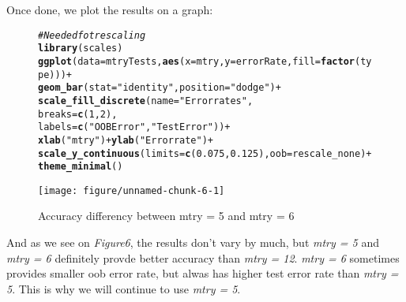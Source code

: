 \documentclass{article}\usepackage[]{graphicx}\usepackage[]{color}
\makeatletter
\newcommand{\hlnum}[1]{\textcolor[rgb]{0.686,0.059,0.569}{#1}}%
\newcommand{\hlstr}[1]{\textcolor[rgb]{0.192,0.494,0.8}{#1}}%
\newcommand{\hlcom}[1]{\textcolor[rgb]{0.678,0.584,0.686}{\textit{#1}}}%
\newcommand{\hlopt}[1]{\textcolor[rgb]{0,0,0}{#1}}%
\newcommand{\hlstd}[1]{\textcolor[rgb]{0.345,0.345,0.345}{#1}}%
\newcommand{\hlkwc}[1]{\textcolor[rgb]{0.333,0.667,0.333}{#1}}%
\newcommand{\hlkwd}[1]{\textcolor[rgb]{0.737,0.353,0.396}{\textbf{#1}}}%
\newenvironment{kframe}{%
 \def\at@end@of@kframe{}%
 \ifinner\ifhmode%
  \def\at@end@of@kframe{\end{minipage}}%
  \begin{minipage}{\columnwidth}%
 \fi\fi%
 \def\FrameCommand##1{\hskip\@totalleftmargin \hskip-\fboxsep
 \colorbox{shadecolor}{##1}\hskip-\fboxsep
     \hskip-\linewidth \hskip-\@totalleftmargin \hskip\columnwidth}%
 \MakeFramed {\advance\hsize-\width
   \@totalleftmargin\z@ \linewidth\hsize
   \@setminipage}}%
 {\par\unskip\endMakeFramed%
 \at@end@of@kframe}
\newenvironment{knitrout}{}{} %
\makeatother
\begin{document}
\begin{itemize}
Once done, we plot the results on a graph:
\begin {figure}[H]
\begin {center}
\begin{knitrout}
\color{fgcolor}\begin{kframe}
\begin{alltt}
\hlcom{#Needed fot rescaling}
\hlkwd{library}\hlstd{(scales)}
\hlkwd{ggplot}\hlstd{(}\hlkwc{data}\hlstd{=mtryTests,} \hlkwd{aes}\hlstd{(}\hlkwc{x}\hlstd{=mtry,} \hlkwc{y}\hlstd{=errorRate,} \hlkwc{fill}\hlstd{=}\hlkwd{factor}\hlstd{(type)))} \hlopt{+}
  \hlkwd{geom_bar}\hlstd{(}\hlkwc{stat}\hlstd{=}\hlstr{"identity"}\hlstd{,} \hlkwc{position}\hlstd{=}\hlstr{"dodge"}\hlstd{)} \hlopt{+}
  \hlkwd{scale_fill_discrete}\hlstd{(}\hlkwc{name}\hlstd{=}\hlstr{"Error rates"}\hlstd{,}
                      \hlkwc{breaks}\hlstd{=}\hlkwd{c}\hlstd{(}\hlnum{1}\hlstd{,} \hlnum{2}\hlstd{),}
                      \hlkwc{labels}\hlstd{=}\hlkwd{c}\hlstd{(}\hlstr{"OOB Error"}\hlstd{,} \hlstr{"Test Error"}\hlstd{))} \hlopt{+}
  \hlkwd{xlab}\hlstd{(}\hlstr{"mtry"}\hlstd{)}\hlopt{+}\hlkwd{ylab}\hlstd{(}\hlstr{"Error rate"}\hlstd{)} \hlopt{+}
  \hlkwd{scale_y_continuous}\hlstd{(}\hlkwc{limits}\hlstd{=}\hlkwd{c}\hlstd{(}\hlnum{0.075}\hlstd{,}\hlnum{0.125}\hlstd{),}\hlkwc{oob} \hlstd{= rescale_none)} \hlopt{+}
  \hlkwd{theme_minimal}\hlstd{()}
\end{alltt}
\end{kframe}
\texttt{[image: figure/unnamed-chunk-6-1]} 

\end{knitrout}
\caption {Accuracy differency between mtry = 5 and mtry = 6}
\label{fig6}
\end {center}
\end {figure}

And as we see on \textit{Figure6}, the results don't vary by much, but \textit{mtry = 5} and \textit{mtry = 6} definitely provde better accuracy than \textit{mtry = 12}. \textit{mtry = 6} sometimes provides smaller oob error rate, but alwas has higher test error rate than \textit{mtry = 5}. This is why we will continue to use \textit{mtry = 5}.


\end{itemize}
\end{document}
